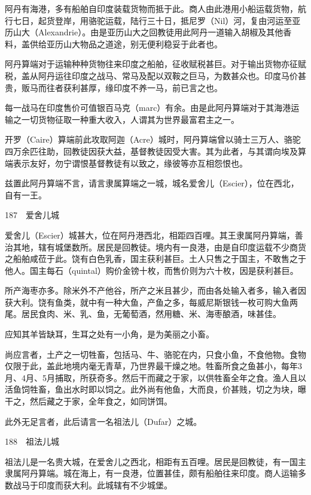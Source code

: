 \documentclass[12pt,UTF8]{ctexbook}
\begin{document}
阿丹有海港，多有船舶自印度装载货物而抵于此。商人由此港用小船运载货物，航行七日，起货登岸，用骆驼运载，陆行三十日，抵尼罗（Nil）河，复由河运至亚历山大（Alexandrie）。由是亚历山大之回教徒用此阿丹一道输入胡椒及其他香料，盖供给亚历山大物品之道途，别无便利稳妥于此者也。

阿丹算端对于运输种种货物往来印度之船舶，征收赋税甚巨。对于输出货物亦征赋税，盖从阿丹运往印度之战马、常马及配以双鞍之巨马，为数甚众也。印度马价甚贵，贩马而往者获利甚厚，缘印度不养一马，前已言之也。

每一战马在印度售价可值银百马克（marc）有余。由是此阿丹算端对于其海港运输之一切货物征取一种重大收入，人谓其为世界最富君主之一。

开罗（Caire）算端前此攻取阿迦（Acre）城时，阿丹算端曾以骑士三万人、骆驼四万余匹往助，回教徒因获大益，基督教徒因受大害。其为此者，与其谓向埃及算端表示友好，勿宁谓恨基督教徒有以致之，缘彼等亦互相怨恨也。

兹置此阿丹算端不言，请言隶属算端之一城，城名爱舍儿（Escier），位在西北，自有一王。





187　爱舍儿城

爱舍儿（Escier）城甚大，位在阿丹港西北，相距四百哩。其王隶属阿丹算端，善治其地，辖有城堡数所。居民是回教徒。境内有一良港，由是自印度运载不少商货之船舶咸莅于此。饶有白色乳香，国主获利甚巨。土人只售之于国主，不敢售之于他人。国主每石（quintal）购价金镑十枚，而售价则为六十枚，因是获利甚巨。

所产海枣亦多。除米外不产他谷，所产之米且甚少，而由各处输入者多，输入者因获大利。饶有鱼类，就中有一种大鱼，产鱼之多，每威尼斯银钱一枚可购大鱼两尾。居民食肉、米、乳、鱼，无葡萄酒，然用糖、米、海枣酿酒，味甚佳。

应知其羊皆缺耳，生耳之处有一小角，是为美丽之小畜。

尚应言者，土产之一切牲畜，包括马、牛、骆驼在内，只食小鱼，不食他物。食物仅限于此，盖此地境内毫无青草，乃世界最干燥之地。牲畜所食之鱼甚小，每年3月、4月、5月捕取，所获奇多。然后干而藏之于家，以供牲畜全年之食。渔人且以活鱼饲牲畜，鱼出水时即以饲之。此外尚有他鱼，大而良，价甚贱，切之为块，曝干之，然后藏之于家，全年食之，如同饼饵。

此外无足言者，此后请言一名祖法儿（Dufar）之城。





188　祖法儿城

祖法儿是一名贵大城，在爱舍儿之西北，相距有五百哩。居民是回教徒，有一国主隶属阿丹算端。城在海上，有一良港，位置甚佳，颇有船舶往来印度。商人运输多数战马于印度而获大利。此城辖有不少城堡。
\end{document}
